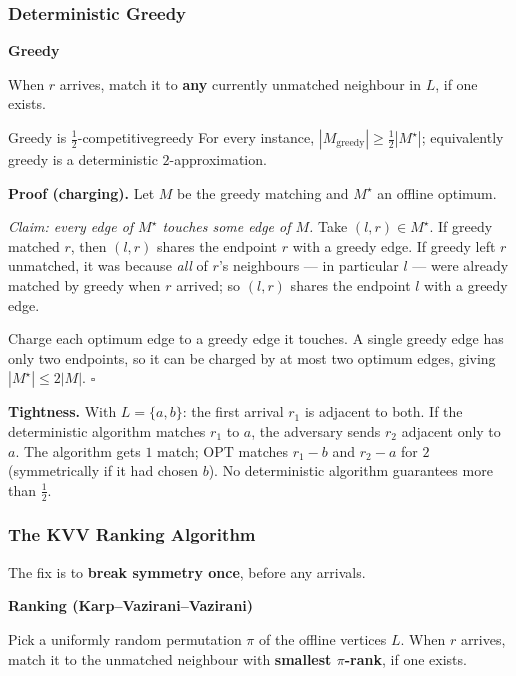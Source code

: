 \subsubsection{Deterministic Greedy}

\begin{mdframed}[backgroundcolor=lightblue, linecolor=keyblue, linewidth=1pt]
\textbf{Greedy}

When $r$ arrives, match it to \textbf{any} currently unmatched neighbour in $L$, if one exists.
\end{mdframed}

\begin{theorem}{Greedy is $\tfrac12$-competitive}{greedy}
For every instance, $|M_{\mathrm{greedy}}| \ge \tfrac12 |M^\star|$; equivalently greedy is a deterministic $2$-approximation.
\end{theorem}

\textbf{Proof (charging).} Let $M$ be the greedy matching and $M^\star$ an offline optimum.

\emph{Claim: every edge of $M^\star$ touches some edge of $M$.} Take $(l, r) \in M^\star$. If greedy matched $r$, then $(l,r)$ shares the endpoint $r$ with a greedy edge. If greedy left $r$ unmatched, it was because \emph{all} of $r$'s neighbours --- in particular $l$ --- were already matched by greedy when $r$ arrived; so $(l,r)$ shares the endpoint $l$ with a greedy edge.

Charge each optimum edge to a greedy edge it touches. A single greedy edge has only two endpoints, so it can be charged by at most two optimum edges, giving $|M^\star| \le 2|M|$. \hfill$\square$

\textbf{Tightness.} With $L = \{a, b\}$: the first arrival $r_1$ is adjacent to both. If the deterministic algorithm matches $r_1$ to $a$, the adversary sends $r_2$ adjacent only to $a$. The algorithm gets $1$ match; $\mathrm{OPT}$ matches $r_1\!-\!b$ and $r_2\!-\!a$ for $2$ (symmetrically if it had chosen $b$). No deterministic algorithm guarantees more than $\tfrac12$.

\subsubsection{The KVV Ranking Algorithm}

The fix is to \textbf{break symmetry once}, before any arrivals.

\begin{mdframed}[backgroundcolor=lightblue, linecolor=keyblue, linewidth=1pt]
\textbf{Ranking (Karp--Vazirani--Vazirani)}

Pick a uniformly random permutation $\pi$ of the offline vertices $L$. When $r$ arrives, match it to the unmatched neighbour with \textbf{smallest $\pi$-rank}, if one exists.
\end{mdframed}

